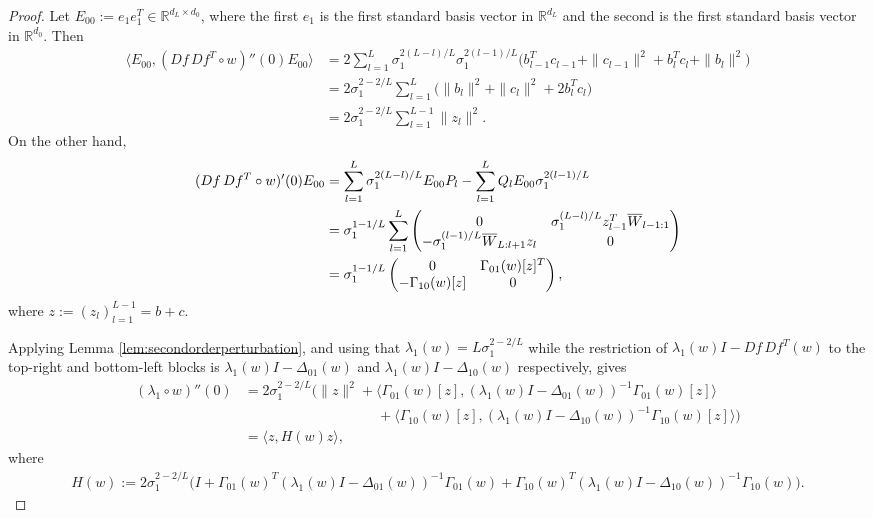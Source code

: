 \documentclass{article}
\newcommand{\RB}{\mathbb{R}}
\newcommand{\bW}{\smash{\overline{W}}\vphantom{W}}
\theoremstyle{plain}
\theoremstyle{definition}
\theoremstyle{remark}
\begin{document}
\begin{proof}
    Let $E_{00}:=e_1e_1^T\in\RB^{d_L\times d_0}$, where the first $e_1$ is the first standard
    basis vector in $\RB^{d_L}$ and the second is the first standard basis vector in $\RB^{d_0}$.
    Then
    \begin{align}
    \big\langle E_{00},(Df\,Df^T\circ w)''(0)E_{00}\big\rangle
    &=
    2\sum_{l=1}^L
    \sigma_1^{2(L-l)/L}\sigma_1^{2(l-1)/L}
    \big(
    b_{l-1}^Tc_{l-1}+\|c_{l-1}\|^2+b_l^Tc_l+\|b_l\|^2
    \big)
    \\
    &=
    2\sigma_1^{2-2/L}\sum_{l=1}^L
    \big(
    \|b_l\|^2+\|c_l\|^2+2b_l^Tc_l
    \big)
    \\
    &=
    2\sigma_1^{2-2/L}\sum_{l=1}^{L-1}\|z_l\|^2.
    \end{align}
    On the other hand,
    \begin{align}
    (Df\,Df^T\circ w)'(0)E_{00}
    &=
    \sum_{l=1}^L
    \sigma_1^{2(L-l)/L}E_{00}P_l
    -
    \sum_{l=1}^L
    Q_lE_{00}\sigma_1^{2(l-1)/L}
    \\
    &=
    \sigma_1^{1-1/L}
    \sum_{l=1}^L
    \begin{pmatrix}
    0 & \sigma_1^{(L-l)/L}z_{l-1}^T\bW_{l-1:1}\\
    -\sigma_1^{(l-1)/L}\bW_{L:l+1}z_l & 0
    \end{pmatrix}
    \\
    &=
    \sigma_1^{1-1/L}
    \begin{pmatrix}
    0 & \Gamma_{01}(w)[z]^T\\
    -\Gamma_{10}(w)[z] & 0
    \end{pmatrix},
    \end{align}
    where $z:=(z_l)_{l=1}^{L-1}=b+c$.
    
    Applying Lemma \ref{lem:secondorderperturbation}, and using that
    $\lambda_1(w)=L\sigma_1^{2-2/L}$ while the restriction of
    $\lambda_1(w)I-Df\,Df^T(w)$ to the top-right and bottom-left blocks is
    $\lambda_1(w)I-\Delta_{01}(w)$ and $\lambda_1(w)I-\Delta_{10}(w)$ respectively, gives
    \begin{align}
    (\lambda_1\circ w)''(0)
    &=
    2\sigma_1^{2-2/L}\Big(
    \|z\|^2
    +
    \big\langle \Gamma_{01}(w)[z],(\lambda_1(w)I-\Delta_{01}(w))^{-1}\Gamma_{01}(w)[z]\big\rangle
    \\
    &\hspace{4cm}
    +
    \big\langle \Gamma_{10}(w)[z],(\lambda_1(w)I-\Delta_{10}(w))^{-1}\Gamma_{10}(w)[z]\big\rangle
    \Big)
    \\
    &=
    \langle z,H(w)z\rangle,
    \end{align}
    where
    \begin{align}
    H(w):=
    2\sigma_1^{2-2/L}\Big(
    I
    +\Gamma_{01}(w)^T(\lambda_1(w)I-\Delta_{01}(w))^{-1}\Gamma_{01}(w)
    +\Gamma_{10}(w)^T(\lambda_1(w)I-\Delta_{10}(w))^{-1}\Gamma_{10}(w)
    \Big).
    \end{align}
    

\end{proof}
\end{document}
